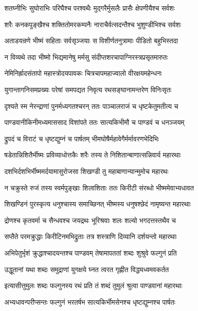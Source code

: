 \twolineshloka
{शतघ्नीभिः सुघोराभिः परिघैश्च परश्वथैः}
{मुद्गरैर्मुसलैः प्रासैः क्षेपणीयैश्च सर्वशः}


\twolineshloka
{शरैः कनकपुङ्खैश्च शक्तितोमरकम्पनैः}
{नाराचैर्वत्सदन्तैश्च भुशुण्डीभिश्च सर्वशः}


\twolineshloka
{अताडयन्रणे भीष्मं सहिताः सर्वसृञ्जयाः}
{स विशीर्णतनुत्रामाः पीडितो बहुभिस्तदा}


\twolineshloka
{न विव्यथे तदा भीष्मो भिद्यमानेषु मर्मसु}
{संदीप्तशरचापाग्निरस्त्रप्रसृतमारुतः}


\twolineshloka
{नेमिनिर्ह्रादसंतापो महास्त्रोदयपावकः}
{चित्रचापमहाज्वालो वीरक्षयमहेन्धनः}


\twolineshloka
{युगान्तागनिसमप्रख्यः परेषां समपद्यत}
{निवृत्य रथसङ्घानामन्तरेण विनिःसृतः}


\twolineshloka
{दृश्यते स्म नेरन्द्राणां पुनर्मध्यगतश्चरन्}
{ततः पाञ्चालराजं च धृष्टकेतुमतीत्य च}


\twolineshloka
{पाण्डवानीकिनीमध्यमाससाद विशांपते}
{ततः सात्यकिभीमौ च पाण्डवं च धनञ्जयम्}


\twolineshloka
{द्रुपदं च विराटं च धृष्टद्युम्नं च पार्षतम्}
{भीमघोषैर्महावेगैर्मर्मावरणभेदिभिः}


\twolineshloka
{षडेतान्निशितैर्भीष्मः प्रविव्याधोत्तकैः शरैः}
{तस्य ते निशितान्बाणात्सन्निवार्य महारथाः}


\twolineshloka
{दशभिर्दशभिर्भीष्ममर्दयामासुरोजसा}
{शिखण्डी तु महाबाणान्यान्मुमोच महारथः}


\twolineshloka
{न चक्रुस्ते रुजं तस्य स्वर्मपुङ्खाः शिलाशिताः}
{ततः किरीटी संरब्धो भीष्ममेवाभ्यधावत}


\twolineshloka
{शिखण्डिनं पुरस्कृत्य धनुश्चास्य समाच्छिनत्}
{भीष्मस्य धनुषश्छेदं नामृष्यन्त महारथाः}


\twolineshloka
{द्रोणश्च कृतवर्मा च सैन्धवश्च जयद्रथः}
{भूरिश्रवाः शलः शल्यो भगदत्तस्तथैव च}


\twolineshloka
{सप्तैते परमक्रुद्धाः किरीटिनमभिद्रुताः}
{तत्र शस्त्राणि दिव्यानि दर्शयन्तो महारथाः}


\twolineshloka
{अभिपेतुर्भृशं क्रुद्धाश्चादयन्तश्च पाण्डवम्}
{तेषामापततां शब्दः शुश्रुवे फल्गुनं प्रति}


\twolineshloka
{उद्धूतानां यथा शब्दः समुद्राणां युगक्षये}
{घ्नत त्वरत गृह्णीत विद्ध्यध्वमवकर्तत}


\twolineshloka
{इत्यासीत्तुमुलः शब्दः फल्गुनस्य रथं प्रति}
{तं शब्दं तुमुलं श्रुत्वा पाण्डवानां महारथाः}


\twolineshloka
{अभ्यधावन्परीप्सन्तः फल्गुनं भरतर्षभ}
{सात्यकिर्भीमसेनश्च धृष्टद्युम्नश्च पार्षतः}


